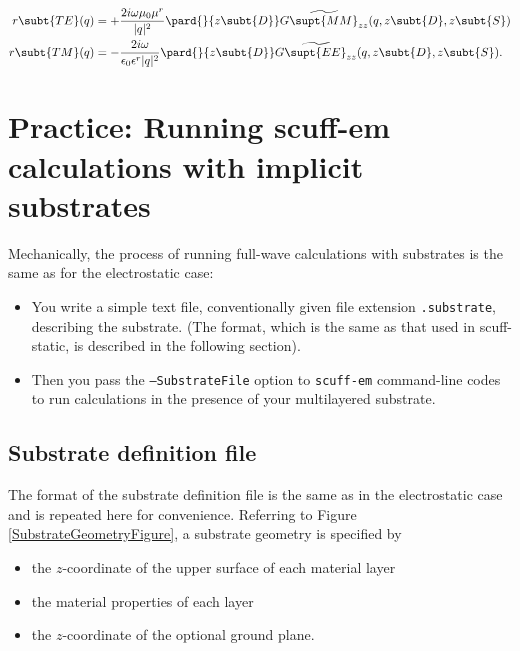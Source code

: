\documentclass[letterpaper]{article}
\renewcommand{\wt}{\widetilde}
\begin{document}
\begin{align*}
 r\subt{TE}(q) &=
 +\frac{2i \omega \mu_0 \mu^r}{|q|^2}\pard{}{z\subt{D}}
 \wt{G\supt{MM}_{zz}}(q, z\subt{D}, z\subt{S})
\\
 r\subt{TM}(q) &=
 -\frac{2i \omega}{\epsilon_0 \epsilon^r |q|^2}\pard{}{z\subt{D}}
 \wt{G\supt{EE}_{zz}}(q, z\subt{D}, z\subt{S}).
\end{align*}
 

\newpage  
\section{Practice: Running {\sc scuff-em} calculations
         with implicit substrates}
\label{MechanicsSection}
 
Mechanically, the process of running full-wave calculations
with substrates is the same as for the electrostatic case:

\begin{itemize}
  \item You write a simple text file, conventionally given
        file extension \texttt{.substrate}, describing the
        substrate. (The format, which is the same as that
        used in {\sc scuff-static}, is described in the 
        following section).
  \item Then you pass the \texttt{--SubstrateFile} option to
        \texttt{scuff-em} command-line codes to run calculations
        in the presence of your multilayered substrate.
\end{itemize}

\subsection{Substrate definition file}

The format of the substrate definition file
is the same as in the electrostatic case
and is repeated here for convenience.
Referring to Figure \ref{SubstrateGeometryFigure},
a substrate geometry is specified by
\begin{itemize}
 \item the $z$-coordinate of the upper surface of each material layer
 \item the material properties of each layer
 \item the $z$-coordinate of the optional ground plane.
\end{itemize}
\end{document}

